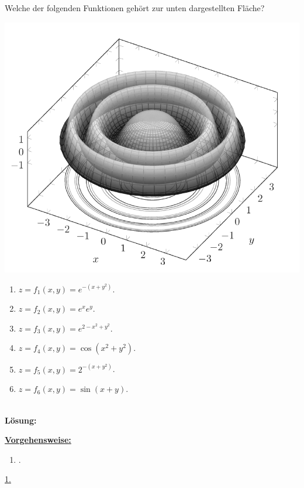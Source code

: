 \subsection*{}
Welche der folgenden Funktionen gehört zur unten dargestellten Fläche?\\
\begin{center}
	\includegraphics[scale=0.5]{pictures/3_5}
\end{center}
\renewcommand{\labelenumi}{(\alph{enumi})}
\begin{enumerate}
	\item 
	$ z = f_1(x,y) = e^{-(x+y^2)} $.
	\item
	$ z = f_2(x,y) = e^{x} e^y $.
	\item
	$ z = f_3(x,y) = e^{2 -x^2 +y^2}  $.
	\item
	$ z = f_4(x,y) = \cos(x^2 +y^2) $.
	\item
	$ z = f_5(x,y) = 2^{-(x + y^2)} $.
	\item
	$ z = f_6(x,y) = \sin(x+y) $.
\end{enumerate}
\ \\
\textbf{Lösung:}
\begin{mdframed}
\underline{\textbf{Vorgehensweise:}}
\renewcommand{\labelenumi}{\theenumi.}
\begin{enumerate}
\item .
\end{enumerate}
\end{mdframed}

\underline{1. }\\


